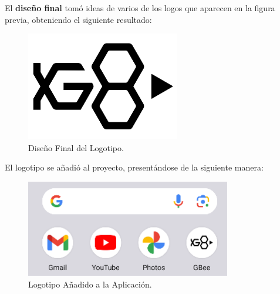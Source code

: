 El \textbf{diseño final} tomó ideas de varios de los logos que aparecen en la figura previa, obteniendo el siguiente resultado:

\begin{figure}[H]
    \centering
    \includegraphics[width=0.6\textwidth]{include/images/gbee.png}
    \caption{Diseño Final del Logotipo.}\label{figure:logofinal}
\end{figure}

El logotipo se añadió al proyecto, presentándose de la siguiente manera:

\begin{figure}[H]
    \centering
    \includegraphics[width=0.8\textwidth]{include/images/logo_app.png}
    \caption{Logotipo Añadido a la Aplicación.}\label{figure:logofinalapp}
\end{figure}

\cleardoublepage